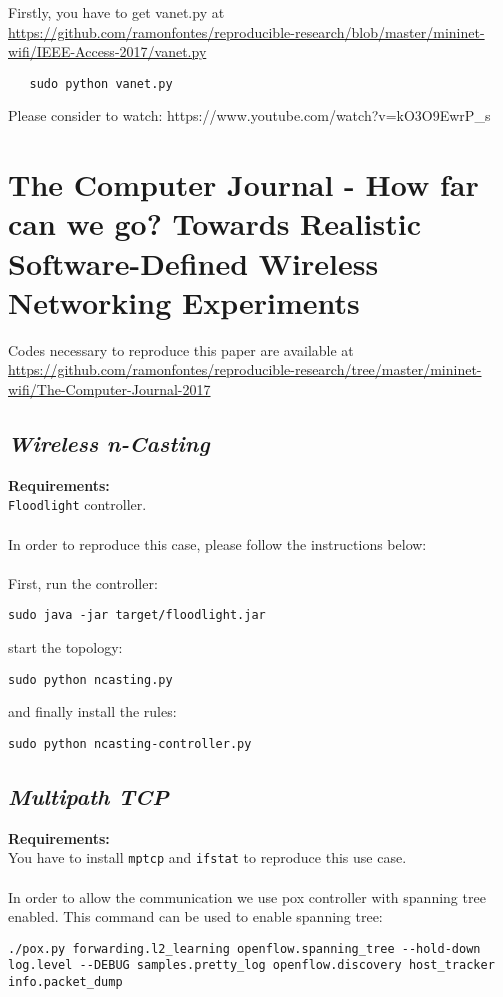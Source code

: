 Firstly, you have to get vanet.py at \url{https://github.com/ramonfontes/reproducible-research/blob/master/mininet-wifi/IEEE-Access-2017/vanet.py}

\begin{verbatim}
   sudo python vanet.py
\end{verbatim}

\noindent Please consider to watch: https://www.youtube.com/watch?v=kO3O9EwrP\_s

\section{The Computer Journal - How far can we go? Towards
Realistic Software-Defined Wireless
Networking Experiments}

Codes necessary to reproduce this paper are available at \url{https://github.com/ramonfontes/reproducible-research/tree/master/mininet-wifi/The-Computer-Journal-2017}

\subsection{\textit{Wireless n-Casting}}
\textbf{Requirements:\\}
\texttt{Floodlight} controller.
\\
\\
In order to reproduce this case, please follow the instructions below:
\\
\\
First, run the controller:
\begin{verbatim}
sudo java -jar target/floodlight.jar
\end{verbatim}


\noindent start the topology:
\begin{verbatim}
sudo python ncasting.py
\end{verbatim}

\noindent and finally install the rules:
\begin{verbatim}
sudo python ncasting-controller.py
\end{verbatim}

\subsection{\textit{Multipath TCP}}
\textbf{Requirements:\\}
You have to install \texttt{mptcp} and \texttt{ifstat} to reproduce this use case. \\
\\
In order to allow the communication we use pox controller with spanning tree enabled. This command can be used to enable spanning tree:
\begin{verbatim}
./pox.py forwarding.l2_learning openflow.spanning_tree --hold-down log.level --DEBUG samples.pretty_log openflow.discovery host_tracker info.packet_dump
\end{verbatim}

